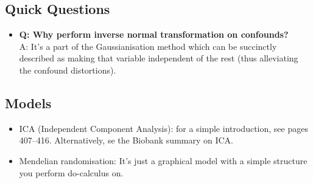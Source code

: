 \documentclass{article}
\begin{document}
\subsection{Quick Questions}
\begin{itemize}
\item {\bf Q: Why perform inverse normal transformation on confounds?} \\
  A: It's a part of the Gaussianisation \cite{Chen2001} method which can be succinctly described as making that variable independent of the rest (thus alleviating the confound distortions).
\end{itemize}

\subsection{Models\label{models}}
\begin{itemize}
\item ICA (Independent Component Analysis): for a simple introduction, see \cite{Murphy2012} pages 407--416. Alternatively, se the Biobank summary on ICA.
\item Mendelian randomisation: It's just a graphical model with a simple structure you perform do-calculus on.
\end{itemize}



\end{document}
